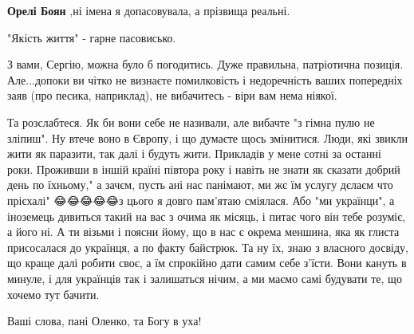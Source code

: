 \begin{itemize}
\begin{itemize}
\textbf{Орелі Боян} ,ні імена я допасовувала, а прізвища реальні.
\end{itemize}

 
"Якість життя" - гарне пасовисько.

 

З вами, Сергію, можна було б погодитись. Дуже правильна, патріотична позиція.
Але...допоки ви чітко не визнаєте помилковість і недоречність ваших попередніх
заяв (про песика, наприклад), не вибачитесь - віри вам нема ніякої.


Та розслабтеся. Як би вони себе не називали, але вибачте "з гімна пулю не
зліпиш". Ну втече воно в Європу, і що думаєте щось змінитися. Люди, які звикли
жити як паразити, так далі і будуть жити. Прикладів у мене сотні за останні
роки. Проживши в іншій країні півтора року і навіть не знати як сказати добрий
день по їхньому," а зачєм, пусть ані нас панімают, ми жє їм услугу дєлаєм что
прієхалі" 😂😂😂😂😂з цього я довго пам'ятаю сміялася. Або "ми українци", а
іноземець дивиться такий на вас з очима як місяць, і питає чого він тебе
розуміє, а його ні. А ти візьми і поясни йому, що в нас є окрема меншина, яка
як глиста присосалася до українця, а по факту байстрюк. Та ну їх, знаю з
власного досвіду, що краще далі робити своє, а їм спрокійно дати самим себе
з'їсти. Вони кануть в минуле, і для українців так і залишаться нічим, а ми
маємо самі будувати те, що хочемо тут бачити.

\begin{itemize}
 
Ваші слова, пані Оленко, та Богу в уха!


\end{itemize}
\end{itemize}
